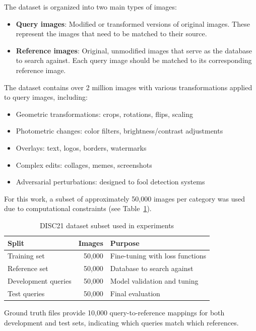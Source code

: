 \documentclass[
    english,
]{VUMIFPSbakalaurinis}
\begin{document}
The dataset is organized into two main types of images:
\begin{itemize}
    \item \textbf{Query images}: Modified or transformed versions of original images. These represent the images that need to be matched to their source.
    \item \textbf{Reference images}: Original, unmodified images that serve as the database to search against. Each query image should be matched to its corresponding reference image.
\end{itemize}

The dataset contains over 2 million images with various transformations applied to query images, including:
\begin{itemize}
    \item Geometric transformations: crops, rotations, flips, scaling
    \item Photometric changes: color filters, brightness/contrast adjustments
    \item Overlays: text, logos, borders, watermarks
    \item Complex edits: collages, memes, screenshots
    \item Adversarial perturbations: designed to fool detection systems
\end{itemize}

For this work, a subset of approximately 50,000 images per category was used due to computational constraints (see Table~\ref{tab:dataset}).

\begin{table}[H]
\centering
\caption{DISC21 dataset subset used in experiments}
\label{tab:dataset}
\begin{tabular}{lrl}
\toprule
\textbf{Split} & \textbf{Images} & \textbf{Purpose} \\
\midrule
Training set & 50,000 & Fine-tuning with loss functions \\
Reference set & 50,000 & Database to search against \\
Development queries & 50,000 & Model validation and tuning \\
Test queries & 50,000 & Final evaluation \\
\bottomrule
\end{tabular}
\end{table}

Ground truth files provide 10,000 query-to-reference mappings for both development and test sets, indicating which queries match which references.
\end{document}
